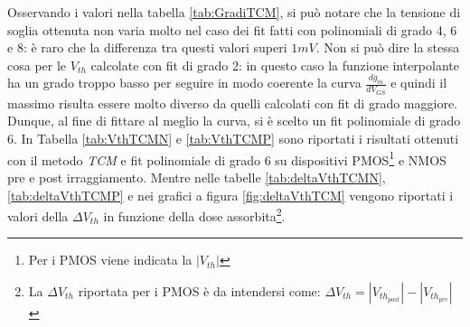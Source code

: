 Osservando i valori nella tabella \ref{tab:GradiTCM}, si può notare che la tensione di soglia ottenuta non varia molto nel caso dei fit fatti con polinomiali di grado 4, 6 e 8: è raro che la differenza tra questi valori superi $1 mV$. Non si può dire la stessa cosa per le $V_{th}$ calcolate con fit di grado 2: in questo caso la funzione interpolante ha un grado troppo basso per seguire in modo coerente la curva $\frac{dg_m}{dV_{GS}}$ e quindi il massimo risulta essere molto diverso da quelli calcolati con fit di grado maggiore. Dunque, al fine di fittare al meglio la curva, si è scelto un fit polinomiale di grado 6. In Tabella \ref{tab:VthTCMN} e \ref{tab:VthTCMP} sono riportati i risultati ottenuti con il metodo \emph{TCM} e fit polinomiale di grado 6 su dispositivi PMOS\footnote{Per i PMOS viene indicata la $|V_{th}|$ } e NMOS pre e post irraggiamento.
Mentre nelle tabelle \ref{tab:deltaVthTCMN}, \ref{tab:deltaVthTCMP} e nei grafici a figura \ref{fig:deltaVthTCM} vengono riportati i valori della $\Delta V_{th}$ in funzione della dose assorbita\footnote{La $\Delta V_{th} $ riportata per i PMOS è da intendersi come: $\Delta V_{th} = |V_{th_{post}}| - |V_{th_{pre}}|$}.



